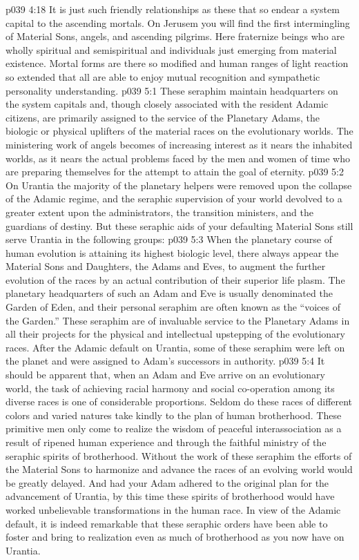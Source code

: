 \vs p039 4:18 It is just such friendly relationships as these that so endear a system capital to the ascending mortals. On Jerusem you will find the first intermingling of Material Sons, angels, and ascending pilgrims. Here fraternize beings who are wholly spiritual and semispiritual and individuals just emerging from material existence. Mortal forms are there so modified and human ranges of light reaction so extended that all are able to enjoy mutual recognition and sympathetic personality understanding.
\vs p039 5:1 These seraphim maintain headquarters on the system capitals and, though closely associated with the resident Adamic citizens, are primarily assigned to the service of the Planetary Adams, the biologic or physical uplifters of the material races on the evolutionary worlds. The ministering work of angels becomes of increasing interest as it nears the inhabited worlds, as it nears the actual problems faced by the men and women of time who are preparing themselves for the attempt to attain the goal of eternity.
\vs p039 5:2 On Urantia the majority of the planetary helpers were removed upon the collapse of the Adamic regime, and the seraphic supervision of your world devolved to a greater extent upon the administrators, the transition ministers, and the guardians of destiny. But these seraphic aids of your defaulting Material Sons still serve Urantia in the following groups:
\pc \vs p039 5:3 \bibnobreakspace {} When the planetary course of human evolution is attaining its highest biologic level, there always appear the Material Sons and Daughters, the Adams and Eves, to augment the further evolution of the races by an actual contribution of their superior life plasm. The planetary headquarters of such an Adam and Eve is usually denominated the Garden of Eden, and their personal seraphim are often known as the “voices of the Garden.” These seraphim are of invaluable service to the Planetary Adams in all their projects for the physical and intellectual upstepping of the evolutionary races. After the Adamic default on Urantia, some of these seraphim were left on the planet and were assigned to Adam’s successors in authority.
\pc \vs p039 5:4 \bibnobreakspace {} It should be apparent that, when an Adam and Eve arrive on an evolutionary world, the task of achieving racial harmony and social co\hyp{}operation among its diverse races is one of considerable proportions. Seldom do these races of different colors and varied natures take kindly to the plan of human brotherhood. These primitive men only come to realize the wisdom of peaceful interassociation as a result of ripened human experience and through the faithful ministry of the seraphic spirits of brotherhood. Without the work of these seraphim the efforts of the Material Sons to harmonize and advance the races of an evolving world would be greatly delayed. And had your Adam adhered to the original plan for the advancement of Urantia, by this time these spirits of brotherhood would have worked unbelievable transformations in the human race. In view of the Adamic default, it is indeed remarkable that these seraphic orders have been able to foster and bring to realization even as much of brotherhood as you now have on Urantia.

